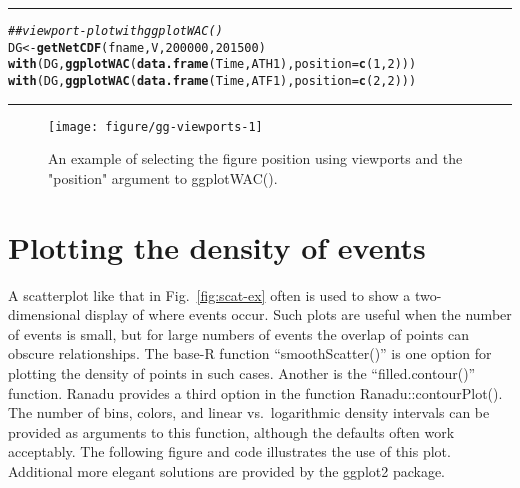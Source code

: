 \documentclass[12pt,english]{report}\usepackage[]{graphicx}\usepackage[]{color}
\makeatletter
\def\maxwidth{ %
  \ifdim\Gin@nat@width>\linewidth
    \linewidth
  \else
    \Gin@nat@width
  \fi
}
\newcommand{\hlnum}[1]{\textcolor[rgb]{0.686,0.059,0.569}{#1}}%
\newcommand{\hlcom}[1]{\textcolor[rgb]{0.678,0.584,0.686}{\textit{#1}}}%
\newcommand{\hlstd}[1]{\textcolor[rgb]{0.345,0.345,0.345}{#1}}%
\newcommand{\hlkwb}[1]{\textcolor[rgb]{0.69,0.353,0.396}{#1}}%
\newcommand{\hlkwc}[1]{\textcolor[rgb]{0.333,0.667,0.333}{#1}}%
\newcommand{\hlkwd}[1]{\textcolor[rgb]{0.737,0.353,0.396}{\textbf{#1}}}%
\newenvironment{kframe}{%
 \def\at@end@of@kframe{}%
 \ifinner\ifhmode%
  \def\at@end@of@kframe{\end{minipage}}%
  \begin{minipage}{\columnwidth}%
 \fi\fi%
 \def\FrameCommand##1{\hskip\@totalleftmargin \hskip-\fboxsep
 \colorbox{shadecolor}{##1}\hskip-\fboxsep
     \hskip-\linewidth \hskip-\@totalleftmargin \hskip\columnwidth}%
 \MakeFramed {\advance\hsize-\width
   \@totalleftmargin\z@ \linewidth\hsize
   \@setminipage}}%
 {\par\unskip\endMakeFramed%
 \at@end@of@kframe}
\newenvironment{knitrout}{}{} %
\renewenvironment{kframe}{\vskip0.1in\hrule}{\hrule\vskip0.1in}
\makeatother
\begin{document}
\pagebreak{}

\begin{knitrout}
\color{fgcolor}\begin{kframe}
\begin{alltt}
\hlcom{## viewport-plot with ggplotWAC()}
\hlstd{DG} \hlkwb{<-} \hlkwd{getNetCDF}\hlstd{(fname, V,} \hlnum{200000}\hlstd{,} \hlnum{201500}\hlstd{)}
\hlkwd{with}\hlstd{(DG,} \hlkwd{ggplotWAC}\hlstd{(}\hlkwd{data.frame}\hlstd{(Time, ATH1),} \hlkwc{position}\hlstd{=}\hlkwd{c}\hlstd{(}\hlnum{1}\hlstd{,}\hlnum{2}\hlstd{)))}
\hlkwd{with}\hlstd{(DG,} \hlkwd{ggplotWAC}\hlstd{(}\hlkwd{data.frame}\hlstd{(Time, ATF1),} \hlkwc{position}\hlstd{=}\hlkwd{c}\hlstd{(}\hlnum{2}\hlstd{,}\hlnum{2}\hlstd{)))}
\end{alltt}
\end{kframe}\begin{figure}

{\centering \texttt{[image: figure/gg-viewports-1]} 

}

\caption[An example of selecting the figure position using viewports and the "position" argument to ggplotWAC()]{An example of selecting the figure position using viewports and the "position" argument to ggplotWAC().}\label{fig:gg-viewports}
\end{figure}


\end{knitrout}

\pagebreak{}

\section{Plotting the density of events}

A scatterplot like that in Fig.~\ref{fig:scat-ex} often is used
to show a two-dimensional display of where events occur. Such plots
are useful when the number of events is small, but for large numbers
of events the overlap of points can obscure relationships. The base-R
function ``smoothScatter()'' is one option for plotting the density
of points in such cases. Another is the ``filled.contour()'' function.
Ranadu provides a third option in the function Ranadu::contourPlot().
The number of bins, colors, and linear vs.~logarithmic density intervals
can be provided as arguments to this function, although the defaults
often work acceptably. The following figure and code illustrates the
use of this plot. Additional more elegant solutions are provided by
the ggplot2 package.
\end{document}
